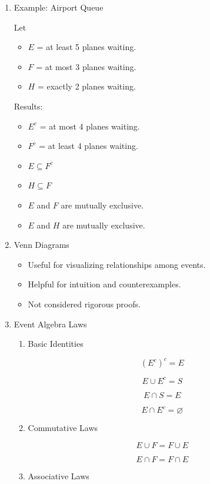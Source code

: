 \documentclass[11pt]{article}
\begin{document}
\begin{enumerate}
\begin{enumerate}
\[
\bigcap_i E_i
\]

All \(E_i\) occur simultaneously.
\end{enumerate}
\item Example: Airport Queue
\label{sec:org2ecfcfe}

Let

\begin{itemize}
\item \(E\) = at least 5 planes waiting.
\item \(F\) = at most 3 planes waiting.
\item \(H\) = exactly 2 planes waiting.
\end{itemize}

Results:

\begin{itemize}
\item \(E^c\) = at most 4 planes waiting.
\item \(F^c\) = at least 4 planes waiting.
\item \(E\subseteq F^c\)
\item \(H\subseteq F\)
\item \(E\) and \(F\) are mutually exclusive.
\item \(E\) and \(H\) are mutually exclusive.
\end{itemize}
\item Venn Diagrams
\label{sec:org780a2ae}

\begin{itemize}
\item Useful for visualizing relationships among events.
\item Helpful for intuition and counterexamples.
\item Not considered rigorous proofs.
\end{itemize}
\item Event Algebra Laws
\label{sec:org9fc10ae}

\begin{enumerate}
\item Basic Identities
\label{sec:org828ea91}

\[
(E^c)^c=E
\]

\[
E\cup E^c=S
\]

\[
E\cap S=E
\]

\[
E\cap E^c=\varnothing
\]
\item Commutative Laws
\label{sec:org09c4d80}

\[
E\cup F=F\cup E
\]

\[
E\cap F=F\cap E
\]
\item Associative Laws
\label{sec:org267caae}


\end{enumerate}
\end{enumerate}
\end{document}
